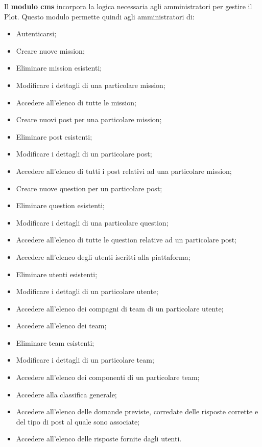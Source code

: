 Il \textbf{modulo \gls{cms}\glsfirstoccur{}} incorpora la logica necessaria agli amministratori per gestire il Plot. Questo modulo permette quindi agli amministratori di:
\begin{itemize}
	\item Autenticarsi;
	\item Creare nuove mission;
	\item Eliminare mission esistenti;
	\item Modificare i dettagli di una particolare mission;
	\item Accedere all'elenco di tutte le mission;
	\item Creare nuovi post per una particolare mission;
	\item Eliminare post esistenti;
	\item Modificare i dettagli di un particolare post;
	\item Accedere all'elenco di tutti i post relativi ad una particolare mission;
	\item Creare nuove question per un particolare post;
	\item Eliminare question esistenti;
	\item Modificare i dettagli di una particolare question;
	\item Accedere all'elenco di tutte le question relative ad un particolare post;
	\item Accedere all'elenco degli utenti iscritti alla piattaforma;
	\item Eliminare utenti esistenti;
	\item Modificare i dettagli di un particolare utente;
	\item Accedere all'elenco dei compagni di team di un particolare utente;
	\item Accedere all'elenco dei team;
	\item Eliminare team esistenti;
	\item Modificare i dettagli di un particolare team;
	\item Accedere all'elenco dei componenti di un particolare team;
	\item Accedere alla classifica generale;
	\item Accedere all'elenco delle domande previste, corredate delle risposte corrette  e del tipo di post al quale sono associate;
	\item Accedere all'elenco delle risposte fornite dagli utenti.
\end{itemize}

